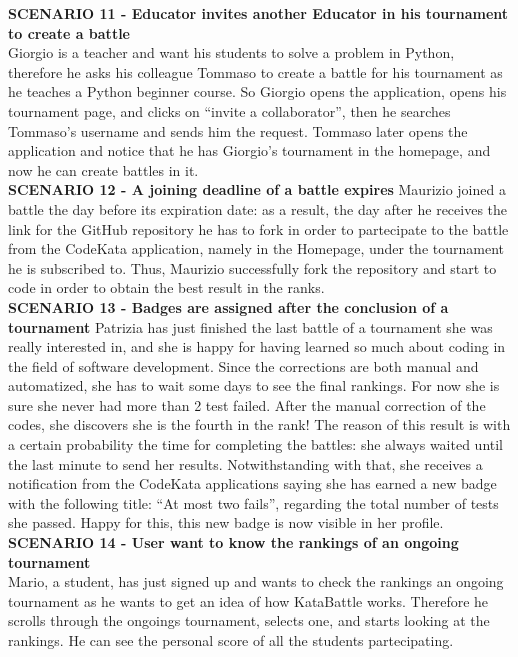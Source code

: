     
    \textbf{SCENARIO 11 - Educator invites another Educator in his tournament to create a battle }\\
    Giorgio is a teacher and want his students to solve a problem in Python, therefore he asks his colleague Tommaso to create a battle for his tournament as he teaches a Python beginner course. So Giorgio opens the application, opens his tournament page, and clicks on ``invite a collaborator'', then he searches Tommaso's username and sends him the request. Tommaso later opens the application and notice that he has Giorgio's tournament in the homepage, and now he can create battles in it. \\

    \textbf{SCENARIO 12 - A joining deadline of a battle expires}
    Maurizio joined a battle the day before its expiration date: as a result, the day after he receives the link for the GitHub repository he has to fork in order to partecipate to the battle from the CodeKata application, namely in the Homepage, under the tournament he is subscribed to. Thus, Maurizio successfully fork the repository and start to code in order to obtain the best result in the ranks.\\

    \textbf{SCENARIO 13 - Badges are assigned after the conclusion of a tournament}
    Patrizia has just finished the last battle of a tournament she was really interested in, and she is happy for having learned so much about coding in the field of software development. Since the corrections are both manual and automatized, she has to wait some days to see the final rankings. 
    For now she is sure she never had more than 2 test failed.
    After the manual correction of the codes, she discovers she is the fourth in the rank! The reason of this result is with a certain probability the time for completing the battles: she always waited until the last minute to send her results. 
    Notwithstanding with that, she receives a notification from the CodeKata applications saying she has earned a new badge with the following title: ``At most two fails'', regarding the total number of tests she passed. Happy for this, this new badge is now visible in her profile.\\

    \textbf{SCENARIO 14 - User want to know the rankings of an ongoing tournament}\\
    Mario, a student, has just signed up and wants to check the rankings an ongoing tournament as he wants to get an idea of how KataBattle works. Therefore he scrolls through the ongoings tournament, selects one, and starts looking at the rankings. He can see the personal score of all the students partecipating.\\


